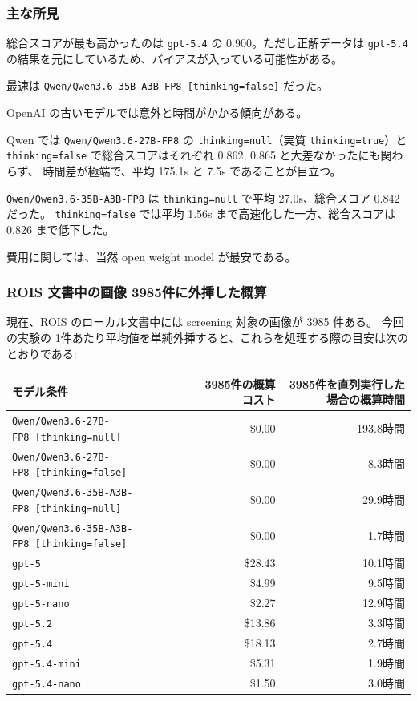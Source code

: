\documentclass[
]{article}
\newcounter{none} %
\begin{document}
\subsubsection{主な所見}\label{ux4e3bux306aux6240ux898b}

総合スコアが最も高かったのは \texttt{gpt-5.4} の
0.900。ただし正解データは \texttt{gpt-5.4}
の結果を元にしているため、バイアスが入っている可能性がある。

最速は \texttt{Qwen/Qwen3.6-35B-A3B-FP8\ {[}thinking=false{]}} だった。

OpenAI の古いモデルでは意外と時間がかかる傾向がある。

Qwen では \texttt{Qwen/Qwen3.6-27B-FP8} の \texttt{thinking=null}（実質
\texttt{thinking=true}）と \texttt{thinking=false}
で総合スコアはそれぞれ 0.862, 0.865 と大差なかったにも関わらず、
時間差が極端で、平均 175.1s と 7.5s であることが目立つ。

\texttt{Qwen/Qwen3.6-35B-A3B-FP8} は \texttt{thinking=null} で平均
27.0s、総合スコア 0.842 だった。 \texttt{thinking=false} では平均 1.56s
まで高速化した一方、総合スコアは 0.826 まで低下した。

費用に関しては、当然 open weight model が最安である。

\subsubsection{ROIS 文書中の画像
3985件に外挿した概算}\label{rois-ux6587ux66f8ux4e2dux306eux753bux50cf-3985ux4ef6ux306bux5916ux633fux3057ux305fux6982ux7b97}

現在、ROIS のローカル文書中には screening 対象の画像が 3985 件ある。
今回の実験の
1件あたり平均値を単純外挿すると、これらを処理する際の目安は次のとおりである:

{\def\LTcaptype{none} %
\begin{longtable}[]{@{}lrr@{}}
\toprule\noalign{}
モデル条件 & 3985件の概算コスト & 3985件を直列実行した場合の概算時間 \\
\midrule\noalign{}
\endhead
\bottomrule\noalign{}
\endlastfoot
\texttt{Qwen/Qwen3.6-27B-FP8\ {[}thinking=null{]}} & \$0.00 &
193.8時間 \\
\texttt{Qwen/Qwen3.6-27B-FP8\ {[}thinking=false{]}} & \$0.00 &
8.3時間 \\
\texttt{Qwen/Qwen3.6-35B-A3B-FP8\ {[}thinking=null{]}} & \$0.00 &
29.9時間 \\
\texttt{Qwen/Qwen3.6-35B-A3B-FP8\ {[}thinking=false{]}} & \$0.00 &
1.7時間 \\
\texttt{gpt-5} & \$28.43 & 10.1時間 \\
\texttt{gpt-5-mini} & \$4.99 & 9.5時間 \\
\texttt{gpt-5-nano} & \$2.27 & 12.9時間 \\
\texttt{gpt-5.2} & \$13.86 & 3.3時間 \\
\texttt{gpt-5.4} & \$18.13 & 2.7時間 \\
\texttt{gpt-5.4-mini} & \$5.31 & 1.9時間 \\
\texttt{gpt-5.4-nano} & \$1.50 & 3.0時間 \\
\end{longtable}
}
\end{document}
